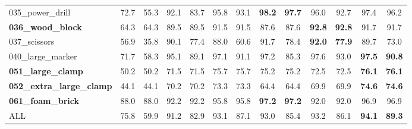 \documentclass[letterpaper, 10 pt, conference]{ieeeconf}
\begin{document}
\begin{table*}[t]
\begin{center}
{\begin{tabular}{l|c|c|c|c|c|c||c|c|c|c|c|c}
035\_power\_drill                  & 72.7 & 55.3                  & 92.1 & 83.7                      & 95.8 & 93.1                    & \textbf{98.2} & \textbf{97.7}   & 96.0           & 92.7            & 97.4           & 96.2           \\
\textbf{036\_wood\_block}         & 64.3 & 64.3                  & 89.5 & 89.5                      & 91.5 & 91.5                    & 87.6           & 87.6            & \textbf{92.8}  & \textbf{92.8}   & 91.7           & 91.7           \\
037\_scissors                      & 56.9 & 35.8                  & 90.1 & 77.4                      & 88.0 & 60.6                    & 91.7           & 78.4            & \textbf{92.0}  & \textbf{77.9}   & 89.7           & 73.0           \\
040\_large\_marker                 & 71.7 & 58.3                  & 95.1 & 89.1                      & 97.1 & 91.1                    & 97.2           & 85.3            & 97.6           & 93.0            & \textbf{97.5}  & \textbf{90.8}  \\
\textbf{051\_large\_clamp}        & 50.2 & 50.2                  & 71.5 & 71.5                      & 75.7 & 75.7                    & 75.2           & 75.2            & 72.5           & 72.5            & \textbf{76.1}  & \textbf{76.1}  \\
\textbf{052\_extra\_large\_clamp}  & 44.1 & 44.1                  & 70.2 & 70.2                      & 73.3 & 73.3                    & 64.4           & 64.4            & 69.9           & 69.9            & \textbf{74.6}  & \textbf{74.6}  \\
\textbf{061\_foam\_brick}         & 88.0 & 88.0                  & 92.2 & 92.2                      & 95.8 & 95.8                    & \textbf{97.2} & \textbf{97.2}    & 92.0           & 92.0            & 96.9           & 96.9           \\ 
\hline
ALL                                & 75.8 & 59.9                  & 91.2 & 82.9                      & 93.1 & 87.1                    & 93.0           & 85.4            & 93.2           & 86.1            & \textbf{94.1}  & \textbf{89.3}  \\
\hline
\end{tabular}\label{tab.ycb}
}
\end{center}\vspace{-0.5cm}
\end{table*}
\end{document}

